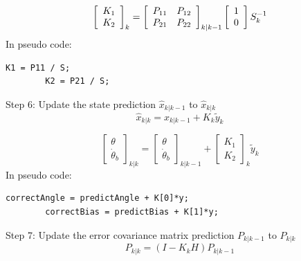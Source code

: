 \documentclass[a4paper]{report}
\begin{document}
		\begin{equation}
		\left[
		\begin{array}{c}
		K_{1}\\
		K_{2}
		\end{array} \right]_{k}
		=
		\left[
		\begin{array}{c c}
		P_{11}	&	P_{12}\\
		P_{21}	&	P_{22}
		\end{array}  \right]_{k|k-1}
		\left[
		\begin{array}{c}
		1\\
		0
		\end{array} \right]
		S^{-1}_{k}
		\end{equation}
    In pseudo code:
		\begin{lstlisting}[frame=single]
		K1 = P11 / S;
		K2 = P21 / S;
		\end{lstlisting}
		Step 6: Update the state prediction $\hat{x}_{k|k-1}$ to  $\hat{x}_{k|k}$
		\begin{equation}
		\label{eq:correct-state-estimation}
		\hat{x}_{k|k}=\hat{x}_{k|k-1}+K_{k}\tilde{y}_{k}
		\end{equation}

		\begin{equation}
		\left[
		\begin{array}{c}
		\theta\\
		\dot{\theta}_{b}
		\end{array} \right]_{k|k}
		=
		\left[
		\begin{array}{c}
		\theta\\
		\dot{\theta}_{b}
		\end{array} \right]_{k|k-1}
		+
		\left[
		\begin{array}{c}
		K_{1}\\
		K_{2}
		\end{array} \right]_{k}
		\tilde{y}_{k}
		\end{equation}
    In pseudo code:
		\begin{lstlisting}[frame=single]
		correctAngle = predictAngle + K[0]*y;
		correctBias = predictBias + K[1]*y;
		\end{lstlisting}
		Step 7: Update the error covariance matrix prediction $P_{k|k-1}$ to $P_{k|k}$
		\begin{equation}
		\label{correct-error-covariance}
		P_{k|k}=(I-K_{k}H)P_{k|k-1}
		\end{equation}
\end{document}
